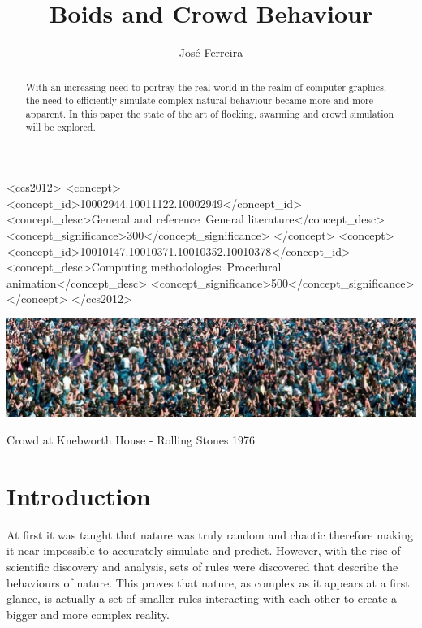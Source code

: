 \documentclass[sigconf]{acmart}
\begin{document}
\title{Boids and Crowd Behaviour}

\author{Jos{\'{e}} Ferreira}

\begin{abstract}
With an increasing need to portray the real world in the realm of computer
graphics, the need to efficiently simulate complex natural behaviour became
more and more apparent. In this paper the state of the art of flocking,
swarming and crowd simulation will be explored.
\end{abstract}

\begin{CCSXML}
<ccs2012>
   <concept>
       <concept_id>10002944.10011122.10002949</concept_id>
       <concept_desc>General and reference~General literature</concept_desc>
       <concept_significance>300</concept_significance>
       </concept>
   <concept>
       <concept_id>10010147.10010371.10010352.10010378</concept_id>
       <concept_desc>Computing methodologies~Procedural animation</concept_desc>
       <concept_significance>500</concept_significance>
       </concept>
 </ccs2012>
\end{CCSXML}



\begin{teaserfigure}
  \includegraphics[width=\textwidth]{images/Crowd_at_Knebworth_House_-_Rolling_Stones_1976.jpg}
  \caption{Crowd at Knebworth House - Rolling Stones 1976}
  \label{fig:teaser}
\end{teaserfigure}

\maketitle

\section{Introduction}
At first it was taught that nature was truly random and chaotic therefore
making it near impossible to accurately simulate and predict.
However, with the rise of scientific discovery and analysis, sets of
rules were discovered that describe the behaviours of nature.
This proves that nature, as complex as it appears at a first glance,
is actually a set of smaller rules interacting with each
other to create a bigger and more complex reality.
\end{document}

